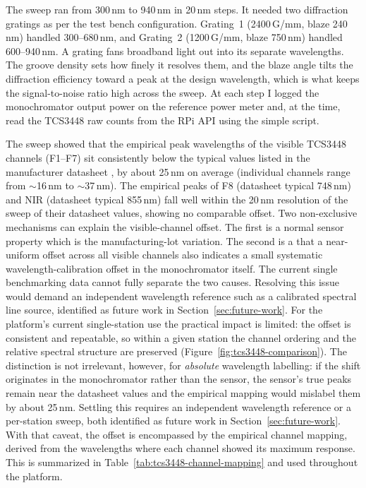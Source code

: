 The sweep ran from 300\,nm to 940\,nm in 20\,nm steps. It needed two diffraction gratings as per the test bench configuration. Grating~1 (2400\,G/mm, blaze 240\,nm) handled 300--680\,nm, and Grating~2 (1200\,G/mm, blaze 750\,nm) handled 600--940\,nm. A grating fans broadband light out into its separate wavelengths. The groove density sets how finely it resolves them, and the blaze angle tilts the diffraction efficiency toward a peak at the design wavelength, which is what keeps the signal-to-noise ratio high across the sweep. At each step I logged the monochromator output power on the reference power meter and, at the time, read the TCS3448 raw counts from the RPi API using the simple script.

The sweep showed that the empirical peak wavelengths of the visible TCS3448 channels (F1--F7) sit consistently below the typical values listed in the manufacturer datasheet \parencite{ams-osram-tcs3448}, by about 25\,nm on average (individual channels range from $\sim$16\,nm to $\sim$37\,nm). The empirical peaks of F8 (datasheet typical 748\,nm) and NIR (datasheet typical 855\,nm) fall well within the 20\,nm resolution of the sweep of their datasheet values, showing no comparable offset. Two non-exclusive mechanisms can explain the visible-channel offset. The first is a normal sensor property which is the manufacturing-lot variation. The second is a that a near-uniform offset across all visible channels also indicates a small systematic wavelength-calibration offset in the monochromator itself. The current single benchmarking data cannot fully separate the two causes. Resolving this issue would demand an independent wavelength reference such as a calibrated spectral line source, identified as future work in Section~\ref{sec:future-work}. For the platform's current single-station use the practical impact is limited: the offset is consistent and repeatable, so within a given station the channel ordering and the relative spectral structure are preserved (Figure~\ref{fig:tcs3448-comparison}). The distinction is not irrelevant, however, for \emph{absolute} wavelength labelling: if the shift originates in the monochromator rather than the sensor, the sensor's true peaks remain near the datasheet values and the empirical mapping would mislabel them by about 25\,nm. Settling this requires an independent wavelength reference or a per-station sweep, both identified as future work in Section~\ref{sec:future-work}. With that caveat, the offset is encompassed by the empirical channel mapping, derived from the wavelengths where each channel showed its maximum response. This is summarized in Table~\ref{tab:tcs3448-channel-mapping} and used throughout the platform.

